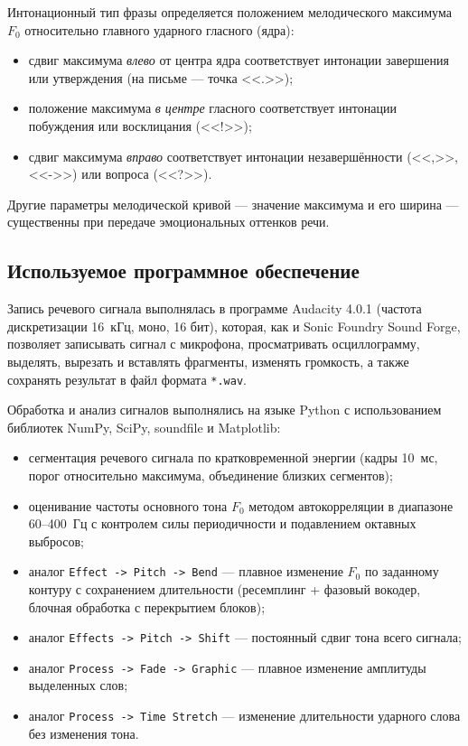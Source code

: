 Интонационный тип фразы определяется положением мелодического максимума
$F_0$ относительно главного ударного гласного (ядра):
\begin{itemize}
	\item сдвиг максимума \emph{влево} от центра ядра соответствует
	интонации завершения или утверждения (на письме --- точка <<.>>);
	\item положение максимума \emph{в центре} гласного соответствует
	интонации побуждения или восклицания (<<!>>);
	\item сдвиг максимума \emph{вправо} соответствует интонации
	незавершённости (<<,>>, <<->>) или вопроса (<<?>>).
\end{itemize}
Другие параметры мелодической кривой --- значение максимума и его ширина
--- существенны при передаче эмоциональных оттенков речи.

\subsection{Используемое программное обеспечение}

Запись речевого сигнала выполнялась в программе Audacity 4.0.1
(частота дискретизации 16~кГц, моно, 16 бит), которая, как и
Sonic Foundry Sound Forge, позволяет записывать сигнал с микрофона,
просматривать осциллограмму, выделять, вырезать и вставлять фрагменты,
изменять громкость, а также сохранять результат в файл формата
\texttt{*.wav}.

Обработка и анализ сигналов выполнялись на языке Python с использованием
библиотек NumPy, SciPy, soundfile и Matplotlib:
\begin{itemize}
	\item сегментация речевого сигнала по кратковременной энергии
	(кадры 10~мс, порог относительно максимума, объединение близких
	сегментов);
	\item оценивание частоты основного тона $F_0$ методом
	автокорреляции в диапазоне 60--400~Гц с контролем силы периодичности
	и подавлением октавных выбросов;
	\item аналог \texttt{Effect -> Pitch -> Bend} --- плавное изменение
	$F_0$ по заданному контуру с сохранением длительности (ресемплинг +
	фазовый вокодер, блочная обработка с перекрытием блоков);
	\item аналог \texttt{Effects -> Pitch -> Shift} --- постоянный сдвиг
	тона всего сигнала;
	\item аналог \texttt{Process -> Fade -> Graphic} --- плавное изменение
	амплитуды выделенных слов;
	\item аналог \texttt{Process -> Time Stretch} --- изменение
	длительности ударного слова без изменения тона.
\end{itemize}
